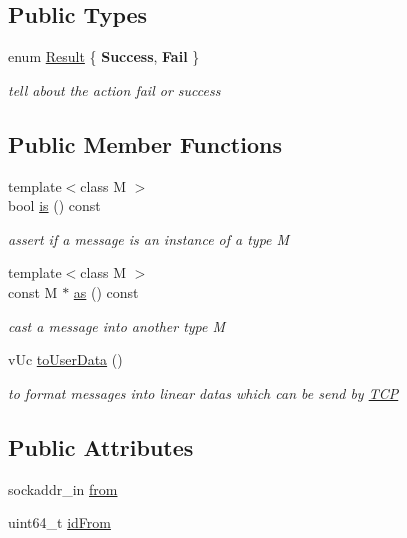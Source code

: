 \subsection*{Public Types}
\begin{DoxyCompactItemize}
\item 
\mbox{\label{class_network_1_1_messages_1_1_base_a646d774928c7dfac987228f26ab5d46a}} 
enum \hyperlink{class_network_1_1_messages_1_1_base_a646d774928c7dfac987228f26ab5d46a}{Result} \{ {\bfseries Success}, 
{\bfseries Fail}
 \}\begin{DoxyCompactList}\small\item\em tell about the action fail or success \end{DoxyCompactList}
\end{DoxyCompactItemize}
\subsection*{Public Member Functions}
\begin{DoxyCompactItemize}
\item 
{\footnotesize template$<$class M $>$ }\\bool \hyperlink{class_network_1_1_messages_1_1_base_ad1147d97f230c6be6276fdf3668b1d0a}{is} () const
\begin{DoxyCompactList}\small\item\em assert if a message is an instance of a type M \end{DoxyCompactList}\item 
{\footnotesize template$<$class M $>$ }\\const M $\ast$ \hyperlink{class_network_1_1_messages_1_1_base_a37110b6d836ed5f17e7ee77d9dca5932}{as} () const
\begin{DoxyCompactList}\small\item\em cast a message into another type M \end{DoxyCompactList}\item 
v\+Uc \hyperlink{class_network_1_1_messages_1_1_base_a3e344e224eab58146feb8c0136cce46f}{to\+User\+Data} ()
\begin{DoxyCompactList}\small\item\em to format messages into linear datas which can be send by \hyperlink{namespace_t_c_p}{T\+CP} \end{DoxyCompactList}\end{DoxyCompactItemize}
\subsection*{Public Attributes}
\begin{DoxyCompactItemize}
\item 
sockaddr\+\_\+in \hyperlink{class_network_1_1_messages_1_1_base_a69cd114b95f2b08d2c1cc7e9e8b3e0d1}{from}
\item 
uint64\+\_\+t \hyperlink{class_network_1_1_messages_1_1_base_a8774bdd6b0cdd35e14379b903617643d}{id\+From}
\end{DoxyCompactItemize}
